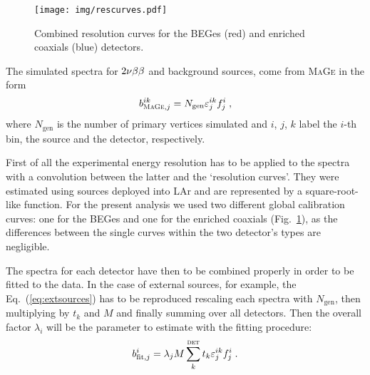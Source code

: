 \begin{figure}
	\centering
	\texttt{[image: img/rescurves.pdf]}
	\caption{Combined resolution curves for the BEGes (red) and enriched coaxials (blue) detectors.}\label{fig:rescurves}
\end{figure}
 The simulated spectra for $2\nbb$ and background sources, come from \textsc{MaGe} in the form
\begin{equation}b^{ik}_{\textsc{MaGe},j}=N_\text{gen}\epsilon^{ik}_jf_j^i\;,\end{equation}
where $N_\text{gen}$ is the number of primary vertices simulated and $i$, $j$, $k$ label the $i$-th bin, the source and the detector, respectively.

First of all the experimental energy resolution has to be applied to the spectra with a convolution between the latter and the `resolution curves'. They were estimated using  sources deployed into LAr and are represented by a square-root-like function. For the present analysis we used two different global calibration curves: one for the BEGes and one for the enriched coaxials (Fig.~\ref{fig:rescurves}), as the differences between the single curves within the two detector's types are negligible.

The spectra for each detector have then to be combined properly in order to be fitted to the data. In the case of external sources, for example, the Eq.~(\ref{eq:extsources}) has to be reproduced rescaling each spectra with $N_\text{gen}$, then multiplying by $t_k$ and $M$ and finally summing over all detectors. Then the overall factor $\lambda_i$ will be the parameter to estimate with the fitting procedure:
\begin{equation}b_{\text{fit},j}^i=\lambda_jM\sum_k^\textsc{det}t_k\epsilon_j^{ik}f_j^i\;.\end{equation}

